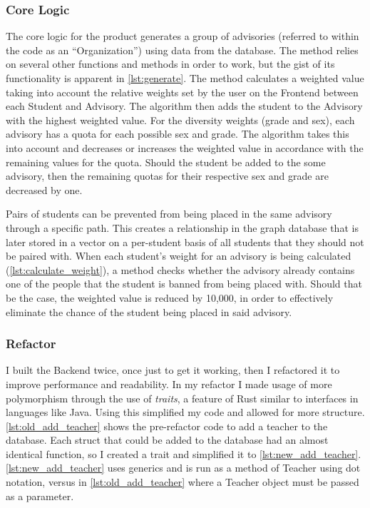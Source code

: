 \documentclass[advisory-ia.tex]{subfiles}
\begin{document}
  \subsubsection{Core Logic}
  The core logic for the product generates a group of advisories (referred to within the code as an \enquote{Organization}) using data from the database.
  The method relies on several other functions and methods in order to work, but the gist of its functionality is apparent in \cref{lst:generate}.
  The method calculates a weighted value taking into account the relative weights set by the user on the Frontend between each Student and Advisory.
  The algorithm then adds the student to the Advisory with the highest weighted value.
  For the diversity weights (grade and sex), each advisory has a quota for each possible sex and grade.
  The algorithm takes this into account and decreases or increases the weighted value in accordance with the remaining values for the quota.
  Should the student be added to the some advisory, then the remaining quotas for their respective sex and grade are decreased by one.

  Pairs of students can be prevented from being placed in the same advisory through a specific path.
  This creates a relationship in the graph database that is later stored in a vector on a per-student basis of all students that they should not be paired with.
  When each student's weight for an advisory is being calculated (\cref{lst:calculate_weight}), a method checks whether the advisory already contains one of the people that the student is banned from being placed with.
  Should that be the case, the weighted value is reduced by 10,000, in order to effectively eliminate the chance of the student being placed in said advisory.



  \subsubsection{Refactor}
  I built the Backend twice, once just to get it working, then I refactored it to improve performance and readability.
  In my refactor I made usage of more polymorphism through the use of \emph{traits}, a feature of Rust similar to interfaces in languages like Java.
  Using this simplified my code and allowed for more structure.
  \cref{lst:old_add_teacher} shows the pre-refactor code to add a teacher to the database.
  Each struct that could be added to the database had an almost identical function, so I created a trait and simplified it to \cref{lst:new_add_teacher}.
  \cref{lst:new_add_teacher} uses generics and is run as a method of Teacher using dot notation, versus in \cref{lst:old_add_teacher} where a Teacher object must be passed as a parameter.
\end{document}
